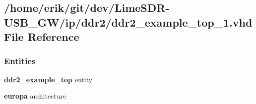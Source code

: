\subsection{/home/erik/git/dev/\+Lime\+S\+D\+R-\/\+U\+S\+B\+\_\+\+G\+W/ip/ddr2/ddr2\+\_\+example\+\_\+top\+\_\+1.vhd File Reference}
\label{ddr2__example__top__1_8vhd}
\subsubsection*{Entities}
\begin{DoxyCompactItemize}
\item 
{\bf ddr2\+\_\+example\+\_\+top} entity
\item 
{\bf europa} architecture
\end{DoxyCompactItemize}

